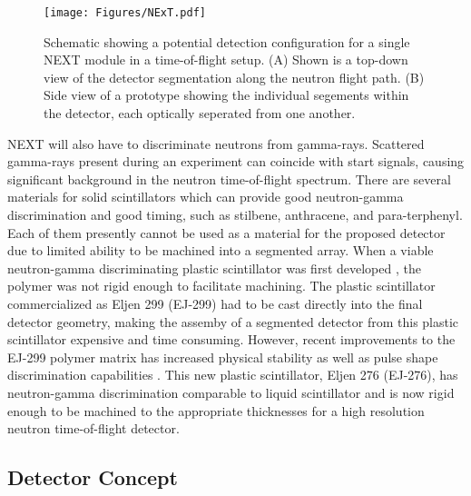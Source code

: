 \documentclass[preprint,3p,twocolumn]{elsarticle}
\begin{document}
\begin{figure}[tp]
  \centering
  \texttt{[image: Figures/NExT.pdf]}
  \caption{Schematic showing a potential detection configuration for a single NEXT module in a time-of-flight setup. (A) Shown is a top-down view of the detector segmentation along the neutron flight path. (B) Side view of a prototype showing the individual segements within the detector, each optically seperated from one another.}
  \label{fig:NEXTschematic}
\end{figure}
NEXT will also have to discriminate neutrons from gamma-rays. Scattered gamma-rays present during an experiment can coincide with start signals, causing significant background in the neutron time-of-flight spectrum.
There are several materials for solid scintillators which can provide good neutron-gamma discrimination and good timing, such as stilbene, anthracene, and para-terphenyl. Each of them presently cannot be used as a material for the proposed detector due to limited ability to be machined into a segmented array. When a viable neutron-gamma discriminating plastic scintillator was first developed \cite{Zaitseva2012}, the polymer was not rigid enough to facilitate machining. The plastic scintillator commercialized as Eljen 299 (EJ-299) had to be cast directly into the final detector geometry, making the assemby of a segmented detector from this plastic scintillator expensive and time consuming. However, recent improvements to the EJ-299 polymer matrix has increased physical stability as well as pulse shape discrimination capabilities \cite{ZAITSEVA201897}. This new plastic scintillator, Eljen 276 (EJ-276), has neutron-gamma discrimination comparable to liquid scintillator and is now rigid enough to be machined to the appropriate thicknesses for a high resolution neutron time-of-flight detector.

\subsection{Detector Concept}
\end{document}
